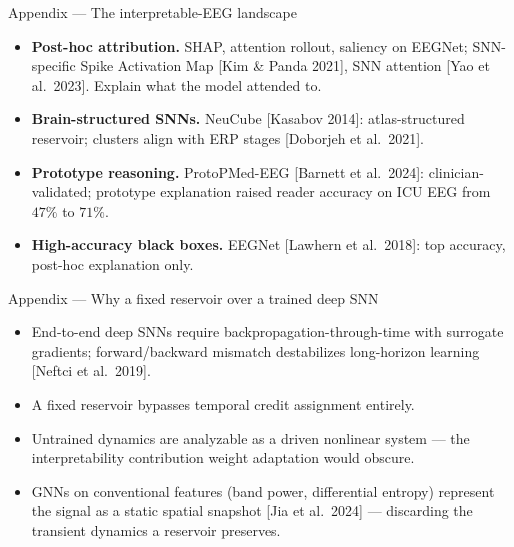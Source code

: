 \documentclass[11pt,aspectratio=169]{beamer}
\newcommand{\refcite}[1]{{\scriptsize\color{gray}[#1]}}
\begin{document}
\begin{frame}{Appendix --- The interpretable-EEG landscape}
  \begin{itemize}\small
    \item \textbf{Post-hoc attribution.} SHAP, attention rollout, saliency on
      EEGNet; SNN-specific Spike Activation Map
      \refcite{Kim \& Panda 2021}, SNN attention \refcite{Yao et al.\ 2023}.
      Explain what the model attended to.
    \item \textbf{Brain-structured SNNs.} NeuCube \refcite{Kasabov 2014}:
      atlas-structured reservoir; clusters align with ERP stages
      \refcite{Doborjeh et al.\ 2021}.
    \item \textbf{Prototype reasoning.} ProtoPMed-EEG
      \refcite{Barnett et al.\ 2024}: clinician-validated; prototype
      explanation raised reader accuracy on ICU EEG from $47\%$ to $71\%$.
    \item \textbf{High-accuracy black boxes.} EEGNet
      \refcite{Lawhern et al.\ 2018}: top accuracy, post-hoc explanation only.
  \end{itemize}
\end{frame}

\begin{frame}{Appendix --- Why a fixed reservoir over a trained deep SNN}
  \begin{itemize}\small
    \item End-to-end deep SNNs require backpropagation-through-time with
      surrogate gradients; forward/backward mismatch destabilizes long-horizon
      learning \refcite{Neftci et al.\ 2019}.
    \item A fixed reservoir bypasses temporal credit assignment entirely.
    \item Untrained dynamics are analyzable as a driven nonlinear system ---
      the interpretability contribution weight adaptation would obscure.
    \item GNNs on conventional features (band power, differential entropy)
      represent the signal as a static spatial snapshot
      \refcite{Jia et al.\ 2024} --- discarding the transient dynamics a
      reservoir preserves.
  \end{itemize}
\end{frame}
\end{document}
